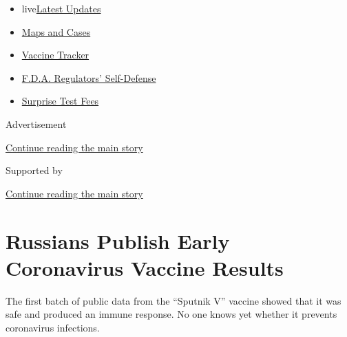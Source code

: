 \begin{itemize}
\tightlist
\item
  live\href{https://www.nytimes3xbfgragh.onion/2020/09/12/world/covid-19-coronavirus.html?name=styln-coronavirus-national\&region=TOP_BANNER\&block=storyline_menu_recirc\&action=click\&pgtype=Article\&impression_id=4fc43c31-f52f-11ea-8b0e-139dcc2f4b62\&variant=undefined}{Latest
  Updates}
\item
  \href{https://www.nytimes3xbfgragh.onion/interactive/2020/us/coronavirus-us-cases.html?name=styln-coronavirus-national\&region=TOP_BANNER\&block=storyline_menu_recirc\&action=click\&pgtype=Article\&impression_id=4fc46340-f52f-11ea-8b0e-139dcc2f4b62\&variant=undefined}{Maps
  and Cases}
\item
  \href{https://www.nytimes3xbfgragh.onion/interactive/2020/science/coronavirus-vaccine-tracker.html?name=styln-coronavirus-national\&region=TOP_BANNER\&block=storyline_menu_recirc\&action=click\&pgtype=Article\&impression_id=4fc46341-f52f-11ea-8b0e-139dcc2f4b62\&variant=undefined}{Vaccine
  Tracker}
\item
  \href{https://www.nytimes3xbfgragh.onion/2020/09/10/us/politics/fda-coronavirus-vaccine.html?name=styln-coronavirus-national\&region=TOP_BANNER\&block=storyline_menu_recirc\&action=click\&pgtype=Article\&impression_id=4fc46342-f52f-11ea-8b0e-139dcc2f4b62\&variant=undefined}{F.D.A.
  Regulators' Self-Defense}
\item
  \href{https://www.nytimes3xbfgragh.onion/2020/09/09/upshot/coronavirus-surprise-test-fees.html?name=styln-coronavirus-national\&region=TOP_BANNER\&block=storyline_menu_recirc\&action=click\&pgtype=Article\&impression_id=4fc46343-f52f-11ea-8b0e-139dcc2f4b62\&variant=undefined}{Surprise
  Test Fees}
\end{itemize}

Advertisement

\protect\hyperlink{after-top}{Continue reading the main story}

Supported by

\protect\hyperlink{after-sponsor}{Continue reading the main story}

\hypertarget{russians-publish-early-coronavirus-vaccine-results}{%
\section{Russians Publish Early Coronavirus Vaccine
Results}\label{russians-publish-early-coronavirus-vaccine-results}}

The first batch of public data from the ``Sputnik V'' vaccine showed
that it was safe and produced an immune response. No one knows yet
whether it prevents coronavirus infections.


